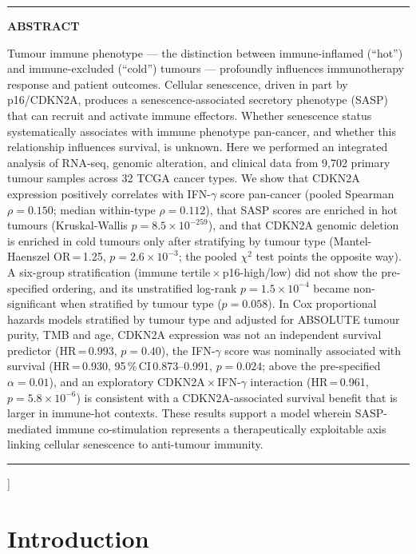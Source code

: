 \documentclass[10pt,twocolumn]{article}
\newenvironment{myabstract}{%
  \begin{minipage}{\linewidth}
  \rule{\linewidth}{1pt}\vspace{3pt}
  {\fontsize{8.5}{11}\selectfont\bfseries ABSTRACT\par}\vspace{3pt}
  \fontsize{8.5}{12}\selectfont
}{%
  \par\vspace{3pt}\rule{\linewidth}{0.5pt}
  \end{minipage}
}
\begin{document}
\begin{@twocolumnfalse}
  \begin{myabstract}
Tumour immune phenotype — the distinction between immune-inflamed
(``hot'') and immune-excluded (``cold'') tumours — profoundly influences
immunotherapy response and patient outcomes. Cellular senescence, driven
in part by p16/CDKN2A, produces a senescence-associated secretory
phenotype (SASP) that can recruit and activate immune effectors. Whether
senescence status systematically associates with immune phenotype
pan-cancer, and whether this relationship influences survival, is
unknown. Here we performed an integrated analysis of RNA-seq, genomic
alteration, and clinical data from 9,702 primary tumour samples across 32 TCGA
cancer types. We show that CDKN2A expression positively correlates with
IFN-$\gamma$ score pan-cancer (pooled Spearman $\rho=0.150$; median
within-type $\rho=0.112$),
that SASP scores are enriched in hot tumours (Kruskal-Wallis
$p=8.5\times10^{-259}$),
and that CDKN2A genomic deletion is enriched in cold tumours only after
stratifying by tumour type (Mantel-Haenszel OR\,=\,1.25, $p=2.6\times10^{-3}$;
the pooled $\chi^2$ test points the opposite way). A six-group
stratification (immune tertile\,$\times$\,p16-high/low) did not show the
pre-specified ordering, and its unstratified log-rank $p=1.5\times10^{-4}$
became non-significant when stratified by tumour type ($p=0.058$). In Cox
proportional hazards models stratified by tumour type and adjusted for
ABSOLUTE tumour purity, TMB and age, CDKN2A expression was not an
independent survival predictor (HR\,=\,0.993, $p=0.40$), the
IFN-$\gamma$ score was nominally associated with survival
(HR\,=\,0.930, 95\,\%\,CI\,0.873--0.991, $p=0.024$; above the
pre-specified $\alpha=0.01$), and an exploratory
CDKN2A\,$\times$\,IFN-$\gamma$ interaction
(HR\,=\,0.961, $p=5.8\times10^{-6}$) is consistent with a CDKN2A-associated
survival benefit that is larger in immune-hot contexts. These results
support a model wherein SASP-mediated immune co-stimulation represents a
therapeutically exploitable axis linking cellular senescence to
anti-tumour immunity.
  \end{myabstract}

  \vspace{14pt}
\end{@twocolumnfalse}%
]

\section{Introduction}
\end{document}
